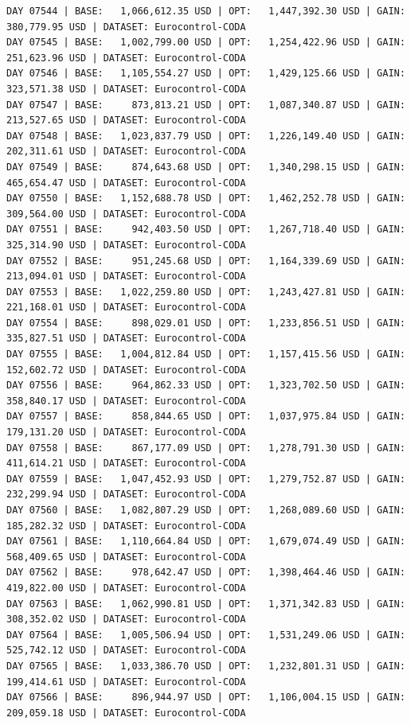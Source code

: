 \documentclass[11pt,a4paper]{article}
\begin{document}
\begin{verbatim}
DAY 07544 | BASE:   1,066,612.35 USD | OPT:   1,447,392.30 USD | GAIN: 380,779.95 USD | DATASET: Eurocontrol-CODA
DAY 07545 | BASE:   1,002,799.00 USD | OPT:   1,254,422.96 USD | GAIN: 251,623.96 USD | DATASET: Eurocontrol-CODA
DAY 07546 | BASE:   1,105,554.27 USD | OPT:   1,429,125.66 USD | GAIN: 323,571.38 USD | DATASET: Eurocontrol-CODA
DAY 07547 | BASE:     873,813.21 USD | OPT:   1,087,340.87 USD | GAIN: 213,527.65 USD | DATASET: Eurocontrol-CODA
DAY 07548 | BASE:   1,023,837.79 USD | OPT:   1,226,149.40 USD | GAIN: 202,311.61 USD | DATASET: Eurocontrol-CODA
DAY 07549 | BASE:     874,643.68 USD | OPT:   1,340,298.15 USD | GAIN: 465,654.47 USD | DATASET: Eurocontrol-CODA
DAY 07550 | BASE:   1,152,688.78 USD | OPT:   1,462,252.78 USD | GAIN: 309,564.00 USD | DATASET: Eurocontrol-CODA
DAY 07551 | BASE:     942,403.50 USD | OPT:   1,267,718.40 USD | GAIN: 325,314.90 USD | DATASET: Eurocontrol-CODA
DAY 07552 | BASE:     951,245.68 USD | OPT:   1,164,339.69 USD | GAIN: 213,094.01 USD | DATASET: Eurocontrol-CODA
DAY 07553 | BASE:   1,022,259.80 USD | OPT:   1,243,427.81 USD | GAIN: 221,168.01 USD | DATASET: Eurocontrol-CODA
DAY 07554 | BASE:     898,029.01 USD | OPT:   1,233,856.51 USD | GAIN: 335,827.51 USD | DATASET: Eurocontrol-CODA
DAY 07555 | BASE:   1,004,812.84 USD | OPT:   1,157,415.56 USD | GAIN: 152,602.72 USD | DATASET: Eurocontrol-CODA
DAY 07556 | BASE:     964,862.33 USD | OPT:   1,323,702.50 USD | GAIN: 358,840.17 USD | DATASET: Eurocontrol-CODA
DAY 07557 | BASE:     858,844.65 USD | OPT:   1,037,975.84 USD | GAIN: 179,131.20 USD | DATASET: Eurocontrol-CODA
DAY 07558 | BASE:     867,177.09 USD | OPT:   1,278,791.30 USD | GAIN: 411,614.21 USD | DATASET: Eurocontrol-CODA
DAY 07559 | BASE:   1,047,452.93 USD | OPT:   1,279,752.87 USD | GAIN: 232,299.94 USD | DATASET: Eurocontrol-CODA
DAY 07560 | BASE:   1,082,807.29 USD | OPT:   1,268,089.60 USD | GAIN: 185,282.32 USD | DATASET: Eurocontrol-CODA
DAY 07561 | BASE:   1,110,664.84 USD | OPT:   1,679,074.49 USD | GAIN: 568,409.65 USD | DATASET: Eurocontrol-CODA
DAY 07562 | BASE:     978,642.47 USD | OPT:   1,398,464.46 USD | GAIN: 419,822.00 USD | DATASET: Eurocontrol-CODA
DAY 07563 | BASE:   1,062,990.81 USD | OPT:   1,371,342.83 USD | GAIN: 308,352.02 USD | DATASET: Eurocontrol-CODA
DAY 07564 | BASE:   1,005,506.94 USD | OPT:   1,531,249.06 USD | GAIN: 525,742.12 USD | DATASET: Eurocontrol-CODA
DAY 07565 | BASE:   1,033,386.70 USD | OPT:   1,232,801.31 USD | GAIN: 199,414.61 USD | DATASET: Eurocontrol-CODA
DAY 07566 | BASE:     896,944.97 USD | OPT:   1,106,004.15 USD | GAIN: 209,059.18 USD | DATASET: Eurocontrol-CODA

\end{verbatim}
\end{document}
